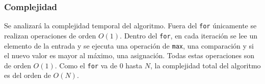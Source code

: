 \subsubsection{Complejidad}
Se analizará la complejidad temporal del algoritmo.
Fuera del \texttt{for} únicamente se realizan operaciones de orden $O(1)$. Dentro del \texttt{for}, en cada iteración se lee un elemento de la entrada y se ejecuta una operación de \texttt{max}, una comparación y si el nuevo valor es mayor al máximo, una asignación. Todas estas operaciones son de orden $O(1)$.
Como el \texttt{for} va de $0$ hasta $N$, la complejidad total del algoritmo es del orden de $O(N)$.